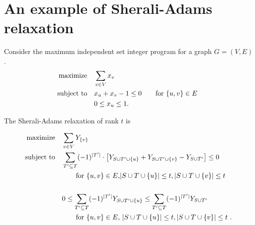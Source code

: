 \documentclass[a4paper,twoside,justified]{tufte-handout}
\begin{document}
\section{An example of Sherali-Adams relaxation}

Consider the maximum independent set integer program for a graph $
G=(V,E)$.
\begin{alignat}{2}
  \text{maximize}\hspace{1em}& \sum_{v\in V} x_{v}\notag \\
  \text{subject to}\hspace{1em}& x_{u} + x_{v} - 1\leq 0 \qquad \text{for $ \{u,v\}\in E $ }\\
  & 0 \leq x_{u}\leq 1.\notag
\end{alignat}

The Sherali-Adams relaxation of rank $t$ is

\begin{alignat*}{2}
  \text{maximize}\hspace{1em}& \sum_{v\in V} Y_{\{v\}}\notag \\
  \text{subject to}\hspace{1em}& \sum_{T'\subseteq T} (-1)^{|T'|} \cdot 
  \left[ 
    Y_{S\cup T'\cup \{u\} } + Y_{S\cup T'\cup \{v\} } - Y_{S\cup T'}
  \right]
  \leq 0 \\ 
  &\qquad \text{for $ \{u,v\}\in E $,$ |S\cup T\cup \{u\}| \leq
    t,|S\cup T\cup \{v\}|\leq t $}\\
  \\
  &0 \leq \sum_{T'\subseteq T} (-1)^{|T'|} Y_{S\cup T'\cup \{u\} } \leq
  \sum_{T'\subseteq T} (-1)^{|T'|} Y_{S\cup T' }\\
  &\qquad \text{for $ \{u,v\}\in E $, $|S\cup T\cup \{u\}| \leq
    t,|S\cup T\cup \{v\}|\leq t $  }.
\end{alignat*}




\end{document}
